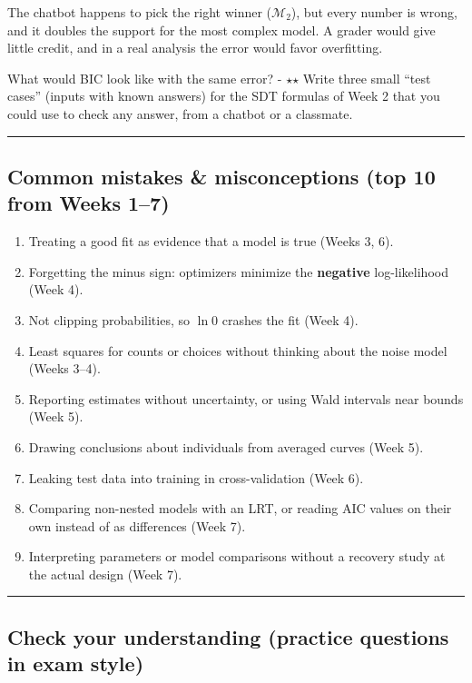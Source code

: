 The chatbot happens to pick the right winner (\(\mathcal{M}_2\)), but
every number is wrong, and it doubles the support for the most complex
model. A grader would give little credit, and in a real analysis the
error would favor overfitting.

What would BIC look like with the same error? - \ensuremath{\star}\ensuremath{\star} Write three small
``test cases'' (inputs with known answers) for the SDT formulas of Week
2 that you could use to check any answer, from a chatbot or a classmate.

\begin{center}\rule{0.5\linewidth}{0.5pt}\end{center}

\subsection{Common mistakes \& misconceptions (top 10 from Weeks 1--7)}

\begin{enumerate}
\def\labelenumi{\arabic{enumi}.}
\tightlist
\item
  Treating a good fit as evidence that a model is true (Weeks 3, 6).
\item
  Forgetting the minus sign: optimizers minimize the \textbf{negative}
  log-likelihood (Week 4).
\item
  Not clipping probabilities, so \(\ln 0\) crashes the fit (Week 4).
\item
  Least squares for counts or choices without thinking about the noise
  model (Weeks 3--4).
\item
  Reporting estimates without uncertainty, or using Wald intervals near
  bounds (Week 5).
\item
  Drawing conclusions about individuals from averaged curves (Week 5).
\item
  Leaking test data into training in cross-validation (Week 6).
\item
  Comparing non-nested models with an LRT, or reading AIC values on
  their own instead of as differences (Week 7).
\item
  Interpreting parameters or model comparisons without a recovery study
  at the actual design (Week 7).
\end{enumerate}

\begin{center}\rule{0.5\linewidth}{0.5pt}\end{center}

\subsection{Check your understanding (practice questions in exam style)}

